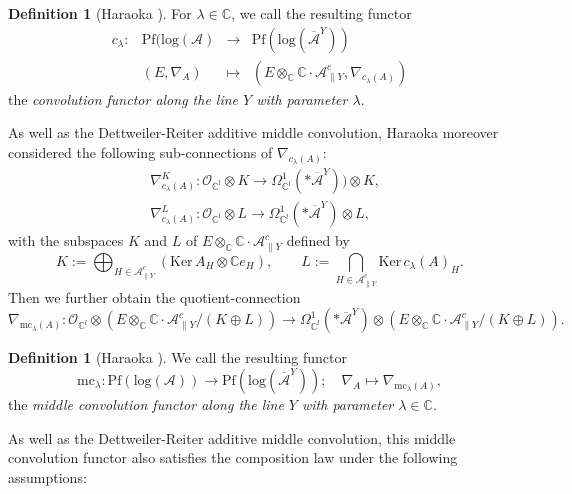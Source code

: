 \documentclass[a4paper,12pt]{article}
\theoremstyle{definition}
\newtheorem{df}[thm]{Definition}
\theoremstyle{remark}
\begin{document}
\begin{df}[Haraoka \cite{Har1}]
For $\lambda\in \mathbb{C}$, we call the resulting functor
\[
	\begin{array}{cccc}
	c_{\lambda}\colon & \mathrm{Pf}(\mathrm{log}(\mathcal{A}) & \longrightarrow & \mathrm{Pf}(\mathrm{log}(\overline{\mathcal{A}}^{Y}))\\
& (E,\nabla_{A}) & \mapsto & (E\otimes_{\mathbb{C}}\mathbb{C}\cdot \mathcal{A}_{\parallel Y}^{c},\nabla_{c_{\lambda}(A)})
	\end{array}
\]
the \emph{convolution functor along the line $Y$ with parameter $\lambda$}.
\end{df}
As well as the Dettweiler-Reiter additive middle convolution, Haraoka moreover
considered the following sub-connections of $\nabla_{c_{\lambda}(A)}$:
\begin{align*}
	&\nabla_{c_{\lambda}(A)}^{K}\colon
	\mathcal{O}_{\mathbb{C}^{l}}\otimes K
	\longrightarrow
	\varOmega_{\mathbb{C}^{l}}^{1}(*\overline{\mathcal{A}}^{Y}))\otimes K,\\
	&\nabla_{c_{\lambda}(A)}^{L}\colon
	\mathcal{O}_{\mathbb{C}^{l}}\otimes L
	\longrightarrow
	\varOmega_{\mathbb{C}^{l}}^{1}(*\overline{\mathcal{A}}^{Y})\otimes L,
\end{align*}
with the subspaces $K$ and $L$ of $E\otimes_{\mathbb{C}}\mathbb{C}\cdot \mathcal{A}_{\parallel Y}^{c}$ defined by
\[
	K:=\bigoplus_{H\in \mathcal{A}_{\parallel Y}^{c}}\left(\mathrm{Ker\,}A_{H}\otimes \mathbb{C}e_{H}\right),\quad\quad
	L:=\bigcap_{H\in \mathcal{A}_{\parallel Y}^{c}}\mathrm{Ker\,}c_{\lambda}(A)_{H}.
\]
Then we further obtain the quotient-connection
\[
	\nabla_{\mathrm{mc}_{\lambda}(A)}\colon
	\mathcal{O}_{\mathbb{C}^{l}}\otimes (E\otimes_{\mathbb{C}}\mathbb{C}\cdot \mathcal{A}_{\parallel Y}^{c}/(K\oplus L))
	\longrightarrow
	\varOmega_{\mathbb{C}^{l}}^{1}(*\overline{\mathcal{A}}^{Y})
	\otimes (E\otimes_{\mathbb{C}}\mathbb{C}\cdot \mathcal{A}_{\parallel Y}^{c}/(K\oplus L)).
\]
\begin{df}[Haraoka \cite{Har1}]
We call the resulting functor
\[
	\mathrm{mc}_{\lambda}\colon \mathrm{Pf}(\mathrm{log}(\mathcal{A}))
	\longrightarrow 
	\mathrm{Pf}(\mathrm{log}(\overline{\mathcal{A}}^{Y}));\quad
	\nabla_{A}\mapsto \nabla_{\mathrm{mc}_{\lambda}(A)},
\]
the {\em middle convolution functor along the line $Y$ with parameter $\lambda\in \mathbb{C}$}.
\end{df}
As well as the Dettweiler-Reiter additive middle convolution,
this middle convolution functor also satisfies the composition law under the following assumptions:
\end{document}
